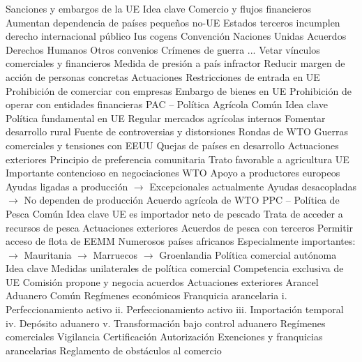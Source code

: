 \documentclass{nuevotema}
\begin{document}
\begin{esquemal}
		\2 Sanciones y embargos de la UE
			\3 Idea clave
				\4 Comercio y flujos financieros
				\4[] Aumentan dependencia de países pequeños no-UE
				\4 Estados terceros incumplen derecho internacional público
				\4[] Ius cogens
				\4[] Convención Naciones Unidas
				\4[] Acuerdos Derechos Humanos
				\4[] Otros convenios
				\4[] Crímenes de guerra
				\4[] ...
				\4 Vetar vínculos comerciales y financieros
				\4[] Medida de presión a país infractor
				\4[] Reducir margen de acción de personas concretas
			\3 Actuaciones
				\4 Restricciones de entrada en UE
				\4 Prohibición de comerciar con empresas
				\4 Embargo de bienes en UE
				\4 Prohibición de operar con entidades financieras
		\2 PAC -- Política Agrícola Común
			\3 Idea clave
				\4 Política fundamental en UE
				\4[] Regular mercados agrícolas internos
				\4[] Fomentar desarrollo rural
				\4 Fuente de controversias y distorsiones
				\4[] Rondas de WTO
				\4[] Guerras comerciales y tensiones con EEUU
				\4[] Quejas de países en desarrollo
			\3 Actuaciones exteriores
				\4 Principio de preferencia comunitaria
				\4[] Trato favorable a agricultura UE
				\4[] Importante contencioso en negociaciones WTO
				\4 Apoyo a productores europeos
				\4[] Ayudas ligadas a producción
				\4[] $\to$ Excepcionales actualmente
				\4[] Ayudas desacopladas
				\4[] $\to$ No dependen de producción
				\4 Acuerdo agrícola de WTO
		\2 PPC -- Política de Pesca Común
			\3 Idea clave
				\4 UE es importador neto de pescado
				\4 Trata de acceder a recursos de pesca
			\3 Actuaciones exteriores
				\4 Acuerdos de pesca con terceros
				\4[] Permitir acceso de flota de EEMM
				\4 Numerosos países africanos
				\4[] Especialmente importantes:
				\4[] $\to$ Mauritania
				\4[] $\to$ Marruecos
				\4[] $\to$ Groenlandia
		\2 Política comercial autónoma
			\3 Idea clave
				\4 Medidas unilaterales de política comercial
				\4 Competencia exclusiva de UE
				\4[] Comisión propone y negocia acuerdos
			\3 Actuaciones exteriores
				\4 Arancel Aduanero Común
				\4 Regímenes económicos
				\4[] Franquicia arancelaria
				\4[] i. Perfeccionamiento activo
				\4[] ii. Perfeccionamiento activo
				\4[] iii. Importación temporal
				\4[] iv. Depósito aduanero
				\4[] v. Transformación bajo control aduanero
				\4 Regímenes comerciales
				\4[] Vigilancia
				\4[] Certificación
				\4[] Autorización
				\4 Exenciones y franquicias arancelarias
			\3 Reglamento de obstáculos al comercio

\end{esquemal}
\end{document}

